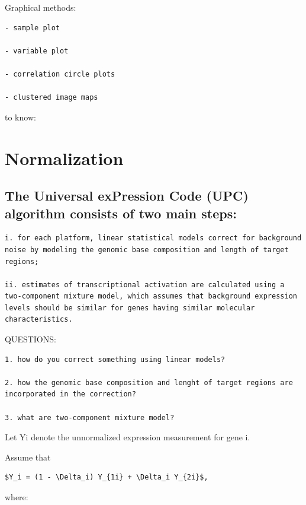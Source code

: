 \documentclass[
]{book}
\begin{document}
Graphical methods:

\begin{verbatim}
- sample plot

- variable plot

- correlation circle plots

- clustered image maps
\end{verbatim}

to know:

\hypertarget{normalization}{%
\section{Normalization}\label{normalization}}

\hypertarget{the-universal-expression-code-upc-algorithm-consists-of-two-main-steps}{%
\subsection{The Universal exPression Code (UPC) algorithm consists of two main steps:}\label{the-universal-expression-code-upc-algorithm-consists-of-two-main-steps}}

\begin{verbatim}
i. for each platform, linear statistical models correct for background noise by modeling the genomic base composition and length of target regions;

ii. estimates of transcriptional activation are calculated using a two-component mixture model, which assumes that background expression levels should be similar for genes having similar molecular characteristics.
\end{verbatim}

QUESTIONS:

\begin{verbatim}
1. how do you correct something using linear models?

2. how the genomic base composition and lenght of target regions are incorporated in the correction?

3. what are two-component mixture model?
\end{verbatim}

Let Yi denote the unnormalized expression measurement for gene i.

Assume that

\begin{verbatim}
$Y_i = (1 - \Delta_i) Y_{1i} + \Delta_i Y_{2i}$,
\end{verbatim}

where:
\end{document}
